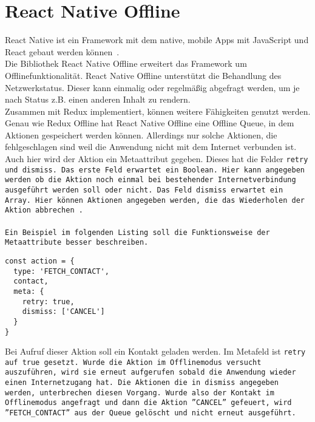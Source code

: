 \section{React Native Offline}
React Native ist ein Framework mit dem native, mobile Apps mit JavaScript und React gebaut werden können~\cite{rn}.\\
Die Bibliothek React Native Offline erweitert das Framework um Offlinefunktionalität.
React Native Offline unterstützt die Behandlung des Netzwerkstatus.
Dieser kann einmalig oder regelmäßig abgefragt werden, um je nach Status z.B. einen anderen Inhalt zu rendern.\\
Zusammen mit Redux implementiert, können weitere Fähigkeiten genutzt werden.
Genau wie Redux Offline hat React Native Offline eine Offline \gls{Queue}, in dem Aktionen gespeichert werden können.
Allerdings nur solche Aktionen, die fehlgeschlagen sind weil die Anwendung nicht mit dem Internet verbunden ist.
Auch hier wird der Aktion ein Metaattribut gegeben. Dieses hat die Felder \tt{retry} und \tt{dismiss}.
Das erste Feld erwartet ein Boolean. Hier kann angegeben werden ob die Aktion noch einmal bei bestehender Internetverbindung ausgeführt werden soll oder nicht.
Das Feld \tt{dismiss} erwartet ein Array. Hier können Aktionen angegeben werden, die das Wiederholen der Aktion abbrechen~\cite{rn-offline-gh}.\\\\
Ein Beispiel im folgenden Listing soll die Funktionsweise der Metaattribute besser beschreiben.
%
\begin{lstlisting}
const action = {
  type: 'FETCH_CONTACT',
  contact,
  meta: {
    retry: true,
    dismiss: ['CANCEL']
  }
}
\end{lstlisting}
%
Bei Aufruf dieser Aktion soll ein Kontakt geladen werden.
Im Metafeld ist \tt{retry} auf \tt{true} gesetzt.
Wurde die Aktion im Offlinemodus versucht auszuführen, wird sie erneut aufgerufen sobald die Anwendung wieder einen Internetzugang hat.
Die Aktionen die in \tt{dismiss} angegeben werden, unterbrechen diesen Vorgang.
Wurde also der Kontakt im Offlinemodus angefragt und dann die Aktion ''CANCEL'' gefeuert, wird ''FETCH\_CONTACT'' aus der Queue gelöscht und nicht erneut ausgeführt.
